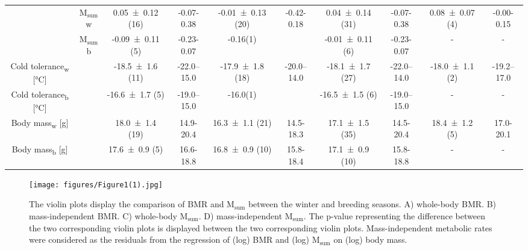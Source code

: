 \documentclass[10pt, twoside]{book} %
\begin{document}
\begin{sidewaystable}[!ht]
\begin{adjustbox}{max width=\textwidth}
\begin{tabular}{cccccccccc}
        ~ & M$_{\text{sum}}$w & 0.05 ± 0.12 (16) & -0.07-0.38 & -0.01 ± 0.13 (20) & -0.42-0.18 & 0.04 ± 0.14 (31) & -0.07-0.38 & 0.08 ± 0.07 (4) & -0.00-0.15 \\ 
        ~ & M$_{\text{sum}}$b & -0.09 ± 0.11 (5) & -0.23-0.07 & -0.16(1) & ~ & -0.01 ± 0.11 (6) & -0.23-0.07 & - & - \\ 
        Cold tolerance\textsubscript{w} [°C] & ~ & -18.5 ± 1.6 (11) & -22.0--15.0 & -17.9 ± 1.8 (18) & -20.0--14.0 & -18.1 ± 1.7 (27) & -22.0--14.0 & -18.0 ± 1.1 (2) & -19.2--17.0 \\ 
        Cold tolerance\textsubscript{b} [°C] & ~ & -16.6 ± 1.7 (5) & -19.0--15.0 & -16.0(1) & ~ & -16.5 ± 1.5 (6) & -19.0--15.0 & - & - \\ 
        Body mass\textsubscript{w} [g] & ~ & 18.0 ± 1.4 (19) & 14.9-20.4 & 16.3 ± 1.1 (21) & 14.5-18.3 & 17.1 ± 1.5 (35) & 14.5-20.4 & 18.4 ± 1.2 (5) & 17.0-20.1 \\ 
        Body mass\textsubscript{b} [g] & ~ & 17.6 ± 0.9 (5) & 16.6-18.8 & 16.8 ± 0.9 (10) & 15.8-18.4 & 17.1 ± 0.9 (10) & 15.8-18.8 & - & - \\ \hline
    \end{tabular}

\end{adjustbox}
\end{sidewaystable}
\clearpage

\renewcommand{\thefigure}{4.\arabic{figure}}
	\begin{figure}[h!]
		\begin{center}
			\texttt{[image: figures/Figure1(1).jpg]}
		\end{center}
		\begin{footnotesize}
			\caption{\footnotesize The violin plots display the comparison of BMR and M$_{\text{sum}}$ between the winter and breeding seasons. A) whole-body BMR. B) mass-independent BMR. C) whole-body M$_{\text{sum}}$. D) mass-independent M$_{\text{sum}}$. The p-value representing the difference between the two corresponding violin plots is displayed between the two corresponding violin plots. Mass-independent metabolic rates were considered as the residuals from the regression of (log) BMR and (log) M$_{\text{sum}}$ on (log) body mass.\label{fig4.1}}
		\end{footnotesize}
	\end{figure}
\clearpage
\end{document}

